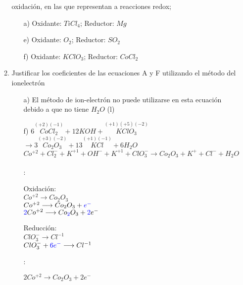 \documentclass[../Práctica.root.tex]{subfiles}
\newcommand{\lra}{\ensuremath{\longrightarrow{}}}
\newcommand{\sr}[2]{\stackrel{#1}{#2}}
\begin{document}
\begin{enumerate}
\begin{enumerate}
                    oxidación, en las que representan a reacciones redox;
                    \begin{enumerate}
                        \item[a)] Oxidante: $TiCl_4$; Reductor: $Mg$
                        \item[e)] Oxidante: $O_2$; Reductor: $SO_2$
                        \item[f)] Oxidante: $KClO_3$; Reductor: $CoCl_2$
                    \end{enumerate}
              \item Justificar los coeficientes de las ecuaciones A y F utilizando el método del ionelectrón
                    \begin{itemize}
                        \item[a)] El método de ion-electrón no puede utilizarse en esta ecuación debido a que no tiene $H_2O$ (l)
                        \item[f)] $6 \sr{(+2)(-1)}{CoCl_2} + 12 KOH + \sr{(+1)(+5)(-2)}{KClO_3}$
                              $\lra 3 \sr{(+3)(-2)}{Co_2O_3} + 13 \sr{(+1)(-1)}{KCl} + 6 H_2O$ \\
                              $Co^{+2} + Cl_2^- + K^{+1} + OH^- + K^{+1} + ClO_3^- \lra Co_2O_3 + K^+ + Cl^- + H_2O$ \\ \\
                              :
                              \begin{multicols}{2}
                                  Oxidación: \\
                                  $Co^{+2} \lra Co_2O_3$ \\
                                  $Co^{+2} \lra Co_2O_3 + \blue{e^-}$ \\
                                  $\blue{2} Co^{+2} \lra Co\blue{_2}O_3 + \blue{2}e^-$

                                  \columnbreak

                                  Reducción: \\
                                  $ClO_3^- \lra Cl^{-1}$ \\
                                  $ClO_3^- + \blue{6e^-} \lra Cl^{-1}$
                              \end{multicols}
                              :
                              \begin{multicols}{2}
                                  $2 Co^{+2} \lra Co_2O_3 + 2 e^-$


\end{multicols}
\end{itemize}
\end{enumerate}
\end{enumerate}
\end{document}
